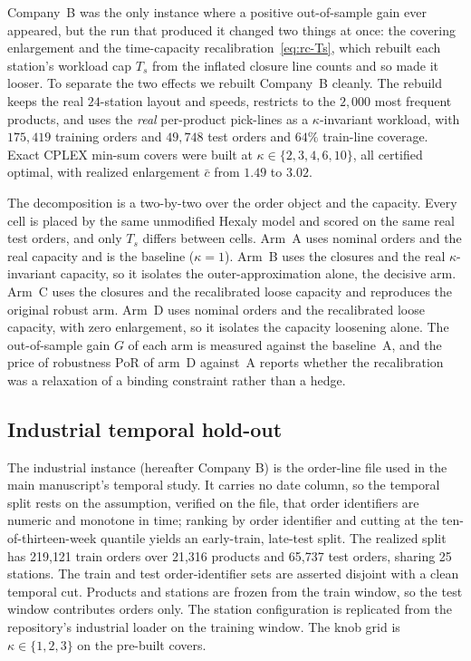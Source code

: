 \documentclass[preprint,review,11pt,authoryear]{elsarticle}
\begin{document}
Company~B was the only instance where a positive out-of-sample gain ever appeared, but the run that produced it changed two things at once: the covering enlargement and the time-capacity recalibration~\eqref{eq:rc-Ts}, which rebuilt each station's workload cap $T_s$ from the inflated closure line counts and so made it looser. To separate the two effects we rebuilt Company~B cleanly. The rebuild keeps the real $24$-station layout and speeds, restricts to the $2{,}000$ most frequent products, and uses the \emph{real} per-product pick-lines as a $\kappa$-invariant workload, with $175{,}419$ training orders and $49{,}748$ test orders and $64\%$ train-line coverage. Exact CPLEX min-sum covers were built at $\kappa \in \{2,3,4,6,10\}$, all certified optimal, with realized enlargement $\bar c$ from $1.49$ to $3.02$.

The decomposition is a two-by-two over the order object and the capacity. Every cell is placed by the same unmodified Hexaly model and scored on the same real test orders, and only $T_s$ differs between cells. Arm~A uses nominal orders and the real capacity and is the baseline ($\kappa=1$). Arm~B uses the closures and the real $\kappa$-invariant capacity, so it isolates the outer-approximation alone, the decisive arm. Arm~C uses the closures and the recalibrated loose capacity and reproduces the original robust arm. Arm~D uses nominal orders and the recalibrated loose capacity, with zero enlargement, so it isolates the capacity loosening alone. The out-of-sample gain $G$ of each arm is measured against the baseline~A, and the price of robustness $\mathrm{PoR}$ of arm~D against~A reports whether the recalibration was a relaxation of a binding constraint rather than a hedge.

\subsection{Industrial temporal hold-out}\label{sec:rc-berner}

The industrial instance (hereafter Company B) is the order-line file used in the main manuscript's temporal study. It carries no date column, so the temporal split rests on the assumption, verified on the file, that order identifiers are numeric and monotone in time; ranking by order identifier and cutting at the ten-of-thirteen-week quantile yields an early-train, late-test split. The realized split has 219{,}121 train orders over 21{,}316 products and 65{,}737 test orders, sharing 25 stations. The train and test order-identifier sets are asserted disjoint with a clean temporal cut. Products and stations are frozen from the train window, so the test window contributes orders only. The station configuration is replicated from the repository's industrial loader on the training window. The knob grid is $\kappa \in \{1,2,3\}$ on the pre-built covers.
\end{document}
